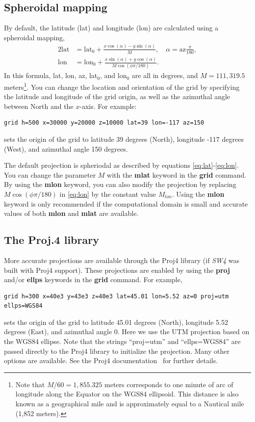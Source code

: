 \documentclass[11pt]{report}
\begin{document}
\subsection{Spheroidal mapping}
By default, the latitude (lat) and longitude (lon) are calculated using a spheroidal mapping,
\begin{alignat}{2}
\mbox{lat} &= \mbox{lat$_0$} + \frac{x\cos(\alpha) - y\sin(\alpha)}{M},\quad \alpha =
\mbox{az}\frac{\pi}{180}, \label{eq:lat}\\
\mbox{lon} &= \mbox{lon$_0$} + \frac{x\sin(\alpha ) + y\cos(\alpha)}{M\cos(\phi \pi/180)}.\label{eq:lon}
\end{alignat}
In this formula, lat, lon, az, lat$_0$, and lon$_0$ are all in degrees, and $M = 111,319.5$
meters\footnote{Note that $M/60 = 1,855.325$ meters corresponds to one minute of arc of
  longitude along the Equator on the WGS84 ellipsoid. This distance is also known as a geographical
  mile and is approximately equal to a Nautical mile (1,852 meters).}.  You can change the location
and orientation of the grid by specifying the latitude and longitude of the grid origin, as well as
the azimuthal angle between North and the $x$-axis. For example:
\begin{verbatim}
grid h=500 x=30000 y=20000 z=10000 lat=39 lon=-117 az=150
\end{verbatim}
sets the origin of the grid to latitude 39 degrees (North), longitude -117 degrees
(West), and azimuthal angle 150 degrees.

The default projection is spheriodal as described by equations \eqref{eq:lat}-\eqref{eq:lon}. You
can change the parameter $M$ with the {\bf mlat} keyword in the {\bf grid} command. By using the
{\bf mlon} keyword, you can also modify the projection by replacing $M\cos(\phi\pi/180)$ in
\eqref{eq:lon} by the constant value $M_{lon}$. Using the {\bf mlon} keyword is only recommended if
the computational domain is small and accurate values of both {\bf mlon} and {\bf mlat} are
available.

\subsection{The Proj.4 library}
More accurate projections are available through the Proj4 library (if
\emph{SW4} was built with Proj4 support). These projections are enabled by using the {\bf proj}
and/or {\bf ellps} keywords in the {\bf grid} command. For example,
\begin{verbatim}
grid h=300 x=40e3 y=43e3 z=40e3 lat=45.01 lon=5.52 az=0 proj=utm ellps=WGS84
\end{verbatim}
sets the origin of the grid to latitude 45.01 degrees (North), longitude 5.52 degrees (East), and
azimuthal angle 0. Here we use the UTM projection based on the WGS84 ellipse. Note that the strings
``proj=utm'' and ``ellps=WGS84'' are passed directly to the Proj4 library to initialize the
projection. Many other options are available. See the Proj4 documentation~\cite{Proj4} for further
details.
\end{document}
